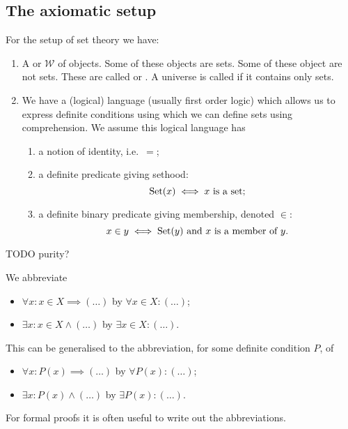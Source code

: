 \subsection{The axiomatic setup}
For the setup of set theory we have:
\begin{enumerate}
\item A  or  $\mathcal{W}$ of objects. Some of these objects are sets. Some of these object are not sets. These are called  or . A universe is called  if it contains only sets.
\item We have a (logical) language (usually first order logic) which allows us to express definite conditions using which we can define sets using comprehension. We assume this logical language has
\begin{enumerate}
\item a notion of identity, i.e.\ $=$;
\item a definite predicate giving sethood:
\[ \operatorname{Set}(x) \iff \text{$x$ is a set}; \]
\item a definite binary predicate giving membership, denoted $\in$:
\[ x\in y \iff \text{$\operatorname{Set}(y)$ and $x$ is a member of $y$}. \]
\end{enumerate}
\end{enumerate}

TODO purity?

\begin{note}
We abbreviate
\begin{itemize}
\item $\forall x: x\in X \implies (\ldots)$ by $\forall x\in X: (\ldots)$;
\item $\exists x: x\in X \land (\ldots)$ by $\exists x\in X: (\ldots)$.
\end{itemize}
This can be generalised to the abbreviation, for some definite condition $P$, of
\begin{itemize}
\item $\forall x: P(x) \implies (\ldots)$ by $\forall P(x): (\ldots)$;
\item $\exists x: P(x) \land (\ldots)$ by $\exists P(x): (\ldots)$.
\end{itemize}
For formal proofs it is often useful to write out the abbreviations.
\end{note}

